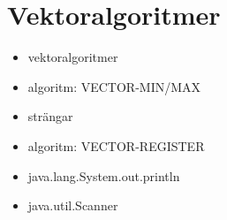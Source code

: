 \chapter{Vektoralgoritmer}\label{chapter:W05}
\begin{itemize}[nosep]
\item vektoralgoritmer
\item algoritm: VECTOR-MIN/MAX
\item strängar
\item algoritm: VECTOR-REGISTER
\item java.lang.System.out.println
\item java.util.Scanner
\end{itemize}